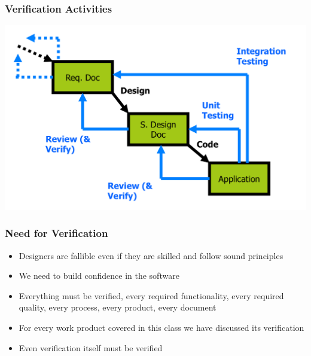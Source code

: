 \documentclass[t,12pt,numbers,fleqn]{beamer}
\begin{document}

\begin{frame}
\frametitle{Verification Activities}

\begin{center}
\includegraphics[scale=0.55]{../Figures/SoftwareLifecycle.png}
\end{center}

\end{frame}



\begin{frame}
\frametitle{Need for Verification}

\begin{itemize}

\item Designers are fallible even if they are skilled and follow sound principles
\item We need to build confidence in the software
\item Everything must be verified, every required functionality, every required
  quality, every process, every product, every document
\item For every work product covered in this class we have discussed its verification
\item Even verification itself must be verified

\end{itemize}

\end{frame}

\end{document}
